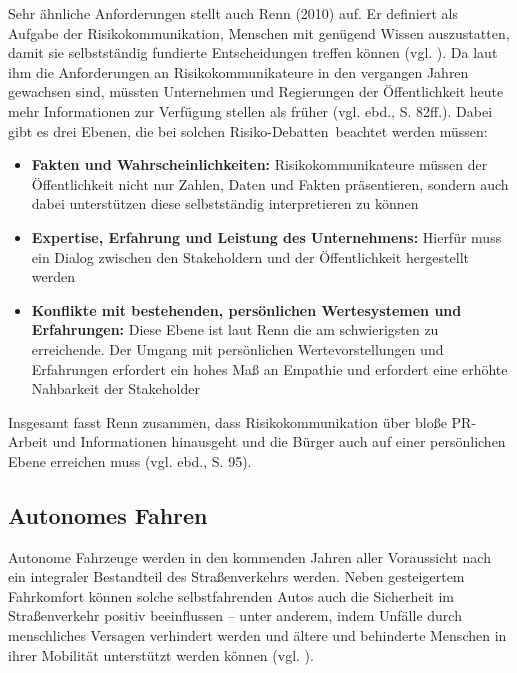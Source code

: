 Sehr ähnliche Anforderungen stellt auch Renn (2010) auf. Er definiert als Aufgabe der Risikokommunikation, Menschen mit genügend Wissen auszustatten, damit sie selbstständig fundierte Entscheidungen treffen können (vgl. \cite[81]{renn2010risk}). Da laut ihm die Anforderungen an Risikokommunikateure in den vergangen Jahren gewachsen sind, müssten Unternehmen und Regierungen der Öffentlichkeit heute mehr Informationen zur Verfügung stellen als früher (vgl. ebd., S. 82ff.). Dabei gibt es drei Ebenen, die bei solchen \glq Risiko-Debatten\grq \, beachtet werden müssen:
\begin{itemize}
  \item \textbf{Fakten und Wahrscheinlichkeiten:} Risikokommunikateure müssen der Öffentlichkeit nicht nur Zahlen, Daten und Fakten präsentieren, sondern auch dabei unterstützen diese selbstständig interpretieren zu können
  \item \textbf{Expertise, Erfahrung und Leistung des Unternehmens:} Hierfür muss ein Dialog zwischen den Stakeholdern und der Öffentlichkeit hergestellt werden
  \item \textbf{Konflikte mit bestehenden, persönlichen Wertesystemen und Erfahrungen:} Diese Ebene ist laut Renn die am schwierigsten zu erreichende. Der Umgang mit persönlichen Wertevorstellungen und Erfahrungen erfordert ein hohes Maß an Empathie und erfordert eine erhöhte Nahbarkeit der Stakeholder
\end{itemize}

Insgesamt fasst Renn zusammen, dass Risikokommunikation über bloße PR-Arbeit und Informationen hinausgeht und die Bürger auch auf einer persönlichen Ebene erreichen muss (vgl. ebd., S. 95).

\subsection{Autonomes Fahren}

Autonome Fahrzeuge werden in den kommenden Jahren aller Voraussicht nach ein integraler Bestandteil des Straßenverkehrs werden. Neben gesteigertem Fahrkomfort können solche selbstfahrenden Autos auch die Sicherheit im Straßenverkehr positiv beeinflussen – unter anderem, indem Unfälle durch menschliches Versagen verhindert werden und ältere und behinderte Menschen in ihrer Mobilität unterstützt werden können (vgl.  \cite[167]{fagnant2015preparing}).


